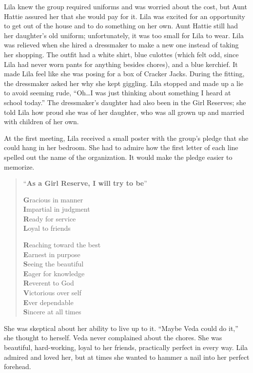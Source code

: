\documentclass[
  letterpaper,
]{book}
\begin{document}
Lila knew the group required uniforms and was worried about the cost,
but Aunt Hattie assured her that she would pay for it. Lila was excited
for an opportunity to get out of the house and to do something on her
own. Aunt Hattie still had her daughter's old uniform; unfortunately, it
was too small for Lila to wear. Lila was relieved when she hired a
dressmaker to make a new one instead of taking her shopping. The outfit
had a white shirt, blue culottes (which felt odd, since Lila had never
worn pants for anything besides chores), and a blue kerchief. It made
Lila feel like she was posing for a box of Cracker Jacks. During the
fitting, the dressmaker asked her why she kept giggling. Lila stopped
and made up a lie to avoid seeming rude, ``Oh\ldots I was just thinking
about something I heard at school today.'' The dressmaker's daughter had
also been in the Girl Reserves; she told Lila how proud she was of her
daughter, who was all grown up and married with children of her own.

At the first meeting, Lila received a small poster with the group's
pledge that she could hang in her bedroom. She had to admire how the
first letter of each line spelled out the name of the organization. It
would make the pledge easier to memorize.

\begin{quote}
``\textbf{As a Girl Reserve, I will try to be}''

\textbf{G}racious in manner\\
\textbf{I}mpartial in judgment\\
\textbf{R}eady for service\\
\textbf{L}oyal to friends

\textbf{R}eaching toward the best\\
\textbf{E}arnest in purpose\\
\textbf{S}eeing the beautiful\\
\textbf{E}ager for knowledge\\
\textbf{R}everent to God\\
\textbf{V}ictorious over self\\
\textbf{E}ver dependable\\
\textbf{S}incere at all times
\end{quote}

She was skeptical about her ability to live up to it. ``Maybe Veda could
do it,'' she thought to herself. Veda never complained about the chores.
She was beautiful, hard-working, loyal to her friends, practically
perfect in every way. Lila admired and loved her, but at times she
wanted to hammer a nail into her perfect forehead.
\end{document}
